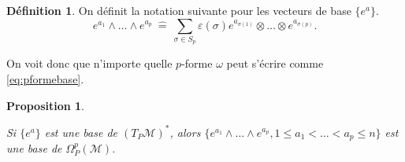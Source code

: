 \documentclass[a4paper,11pt]{report}
\theoremstyle{definition}
\theoremstyle{plain}
\newtheorem{prop}[thm]{Proposition}
\theoremstyle{definition}
\newtheorem{defn}{Définition}[chapter]
\theoremstyle{remark}
\newcommand{\M}{\mathscr{M}}
\begin{document}
            \begin{defn}
                On définit la notation suivante pour les vecteurs de base $\{e^a\}$.
                \begin{equation}
                    e^{a_1}\wedge \dots\wedge e^{a_{p}} ~\hat{=}~ \sum_{\sigma\in S_p}\varepsilon(\sigma)e^{a_{\sigma(1)}}\otimes\dots\otimes e^{a_{\sigma(p)}}.
                \end{equation}
            \end{defn}
            
            On voit donc que n'importe quelle $p$-forme $\omega$ peut s'écrire comme \ref{eq:pformebase}.
            \begin{prop}\begin{leftbar}
                Si $\{e^a\}$ est une base de $(T_P\M)^*$, alors $\{e^{a_1}\wedge\dots \wedge e^{a_p},1\leq a_1<\dots<a_p\leq n\}$ est une base de $\Omega_P^p(\M)$.
            \end{leftbar}\end{prop}
            
\end{document}
